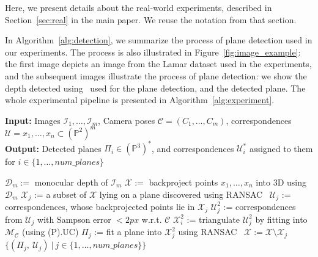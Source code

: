 \documentclass{article}
\newcommand{\PP}{\mathbb{P}}
\begin{document}
Here, we present details about the real-world experiments, described in Section~\ref{sec:real} in the main paper. We reuse the notation from that section.

In Algorithm~\ref{alg:detection}, we summarize the process of plane detection used in our experiments. The process is also illustrated in Figure~\ref{fig:image_example}: the first image depicts an image from the Lamar dataset \cite{sarlin2022lamar} used in the experiments, and the subsequent images illustrate the process of plane detection: we show the depth detected using~\cite{depth_anything_v2} used for the plane detection, and the detected plane. The whole experimental pipeline is presented in Algorithm~\ref{alg:experiment}.

\begin{algorithm}[H]
\caption{Plane detection}
\label{alg:detection}
\textbf{Input:} Images $\mathcal{I}_1,\ldots,\mathcal{I}_m$, Camera poses $\mathcal{C} = (C_1,\ldots,C_m)$, correspondences $ \mathcal{U} = x_1,\dots,x_n  \subset (\PP^2)^m $ \\
\textbf{Output:} Detected planes $\Pi_i \in (\PP^3)^*$, and correspondences $\mathcal{U}_i^*$ assigned to them for $i \in \{1,\ldots,num\_planes\}$
\begin{algorithmic}[1]
\STATE $\mathcal{D}_m := $ monocular depth of $\mathcal{I}_m$
\STATE $\mathcal{X} := $ backproject points $x_1,\dots,x_n$ into 3D using $\mathcal{D}_m$
    \STATE $\mathcal{X}_j$ := a subset of $\mathcal{X}$ lying on a plane discovered using RANSAC~\cite{ransac}
    \STATE $\mathcal{U}_j$ := correspondences, whose backprojected points lie in $\mathcal{X}_j$
    \STATE $\mathcal{U}_j^2$ := correspondences from $\mathcal{U}_j$ with Sampson error $< 2px$ w.r.t. $\mathcal{C}$
    \STATE $\mathcal{X}_i^2$ := triangulate $\mathcal{U}_j^2$ by fitting into $\mathcal{M}_\mathcal{C}$ (using (P).UC)
    \STATE $\Pi_j$ := fit a plane into $\mathcal{X}_j^2$ using RANSAC~\cite{ransac}
    \STATE $\mathcal{X} := \mathcal{X} \setminus \mathcal{X}_j$
\ENDFOR
\RETURN $\{(\Pi_j, \ \mathcal{U}_j) \ \vert \ j \in \{1,\ldots,num\_planes\}\}$
\end{algorithmic}
\end{algorithm}
\vspace{1em}
\end{document}
